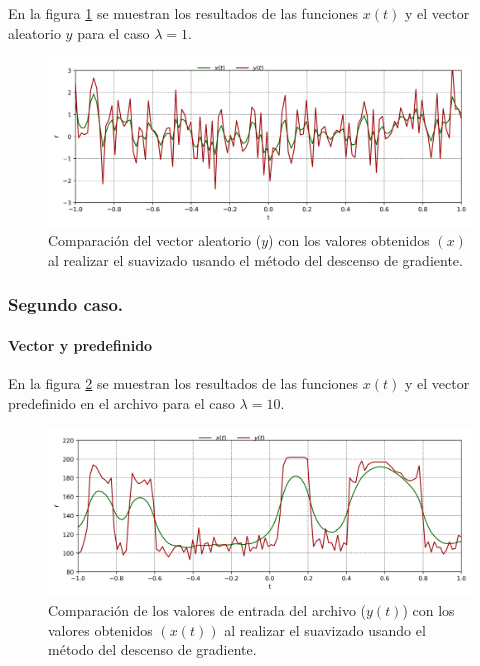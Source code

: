 En la figura \ref{fig:lambda_1} se muestran los resultados de las funciones $x(t)$ y el vector aleatorio $y$ para el caso $\lambda=1$.

\begin{figure}[H]
    \centering
    \includegraphics[width=17cm]{Graphics/Problema_3/lambda_1.png}
    \caption{Comparación del vector aleatorio ($y$) con los valores obtenidos $(x)$ al realizar el suavizado usando el método del descenso de gradiente.}
    \label{fig:lambda_1}
\end{figure}

\subsubsection{Segundo caso.}

\paragraph{Vector y predefinido}

En la figura \ref{fig:lambda_10_test} se muestran los resultados de las funciones $x(t)$ y el vector predefinido en el archivo  para el caso $\lambda=10$.

\begin{figure}[H]
    \centering
    \includegraphics[width=17cm]{Graphics/Problema_3/lambda_10_test.png}
    \caption{Comparación de los valores de entrada del archivo  ($y(t)$) con los valores obtenidos $(x(t))$ al realizar el suavizado usando el método del descenso de gradiente.}
    \label{fig:lambda_10_test}
\end{figure}


